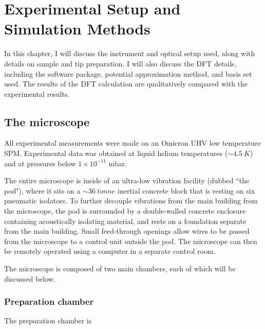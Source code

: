 
\chapter{Experimental Setup and Simulation Methods}
\label{ch:expsetup}

In this chapter, I will discuss the instrument and optical setup used, along with details on sample and tip preparation. I will also discuss the \ac{DFT} details, including the software package, potential approximation method, and basis set used. The results of the \ac{DFT} calculation are qualitatively compared with the experimental results.


\section{The microscope}

All experimental measurements were made on an Omicron \ac{UHV} low temperature \ac{SPM}. Experimental data was obtained at liquid helium temperatures ($\sim \SI{4.5}{K}$) and at pressures below $1 \times 10^{-11}$ mbar. 

The entire microscope is inside of an ultra-low vibration facility (dubbed ``the pod"), where it sits on a $\sim \SI{36}{tonne}$ inertial concrete block that is resting on six pneumatic isolators. To further decouple vibrations from the main building from the microscope, the pod is surrounded by a double-walled concrete enclosure containing acoustically isolating material, and rests on a foundation separate from the main building. Small feed-through openings allow wires to be passed from the microscope to a control unit outside the pod. The microscope can then be remotely operated using a computer in a separate control room.

The microscope is composed of two main chambers, each of which will be discussed below.


\subsection{Preparation chamber}

The preparation chamber is

